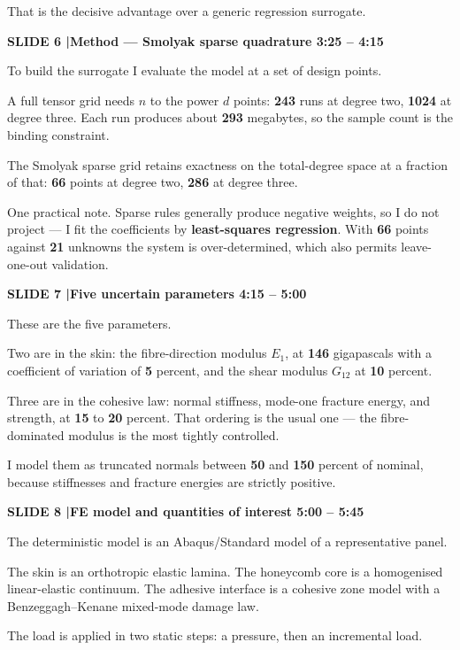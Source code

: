 \documentclass[12pt,a4paper]{article}
\newcommand{\slide}[3]{%
  \bigskip
  \noindent\colorbox{luhblue}{\parbox{\dimexpr\linewidth-2\fboxsep}{%
    \color{white}\bfseries\small SLIDE #1 \quad|\quad #2 \hfill #3}}\par
  \nopagebreak\vspace{0.3em}}
\newcommand{\num}[1]{\textbf{#1}}
\begin{document}
That is the decisive advantage over a generic regression surrogate.

\slide{6}{Method --- Smolyak sparse quadrature}{3:25 -- 4:15}

To build the surrogate I evaluate the model at a set of design points.

A full tensor grid needs $n$ to the power $d$ points: \num{243} runs at degree two,
\num{1024} at degree three. Each run produces about \num{293} megabytes, so the
sample count is the binding constraint.

The Smolyak sparse grid retains exactness on the total-degree space at a fraction of that:
\num{66} points at degree two, \num{286} at degree three.

One practical note. Sparse rules generally produce negative weights, so I do not project
--- I fit the coefficients by \textbf{least-squares regression}. With \num{66} points
against \num{21} unknowns the system is over-determined, which also permits
leave-one-out validation.

\slide{7}{Five uncertain parameters}{4:15 -- 5:00}

These are the five parameters.

Two are in the skin: the fibre-direction modulus $E_1$, at \num{146} gigapascals with a
coefficient of variation of \num{5} percent, and the shear modulus $G_{12}$ at
\num{10} percent.

Three are in the cohesive law: normal stiffness, mode-one fracture energy, and strength,
at \num{15} to \num{20} percent. That ordering is the usual one --- the
fibre-dominated modulus is the most tightly controlled.

I model them as truncated normals between \num{50} and \num{150} percent of nominal,
because stiffnesses and fracture energies are strictly positive.

\slide{8}{FE model and quantities of interest}{5:00 -- 5:45}
The deterministic model is an Abaqus/Standard model of a representative panel.

The skin is an orthotropic elastic lamina. The honeycomb core is a homogenised
linear-elastic continuum. The adhesive interface is a cohesive zone model with a
Benzeggagh--Kenane mixed-mode damage law.

The load is applied in two static steps: a pressure, then an incremental load.
\end{document}
